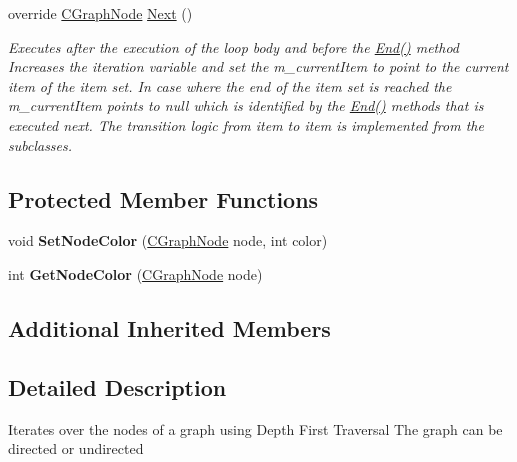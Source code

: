\begin{DoxyCompactItemize}
override \hyperlink{class_graph_library_1_1_c_graph_node}{C\+Graph\+Node} \hyperlink{class_graph_library_1_1_c_it___graph_d_f_s_a89cf17a75298dabb07d6d0ce06895e78}{Next} ()
\begin{DoxyCompactList}\small\item\em Executes after the execution of the loop body and before the \hyperlink{class_graph_library_1_1_c_it___graph_d_f_s_a6f6992493bc70c2e551c5d46bf9bf998}{End()} method Increases the iteration variable and set the m\+\_\+current\+Item to point to the current item of the item set. In case where the end of the item set is reached the m\+\_\+current\+Item points to null which is identified by the \hyperlink{class_graph_library_1_1_c_it___graph_d_f_s_a6f6992493bc70c2e551c5d46bf9bf998}{End()} methods that is executed next. The transition logic from item to item is implemented from the subclasses. \end{DoxyCompactList}\end{DoxyCompactItemize}
\subsection*{Protected Member Functions}
\begin{DoxyCompactItemize}
\item 
\hypertarget{class_graph_library_1_1_c_it___graph_d_f_s_a9d6b05a3cc1d61cfdb614e53cb0d6a53}{}void {\bfseries Set\+Node\+Color} (\hyperlink{class_graph_library_1_1_c_graph_node}{C\+Graph\+Node} node, int color)\label{class_graph_library_1_1_c_it___graph_d_f_s_a9d6b05a3cc1d61cfdb614e53cb0d6a53}

\item 
\hypertarget{class_graph_library_1_1_c_it___graph_d_f_s_ae8b64a6809607ee0258b983b4530e28f}{}int {\bfseries Get\+Node\+Color} (\hyperlink{class_graph_library_1_1_c_graph_node}{C\+Graph\+Node} node)\label{class_graph_library_1_1_c_it___graph_d_f_s_ae8b64a6809607ee0258b983b4530e28f}

\end{DoxyCompactItemize}
\subsection*{Additional Inherited Members}


\subsection{Detailed Description}
Iterates over the nodes of a graph using Depth First Traversal The graph can be directed or undirected 



